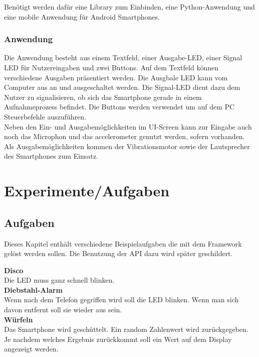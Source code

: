 \documentclass[11pt,a4paper]{report}
\begin{document}
Benötigt werden dafür eine Library zum Einbinden, eine Python-Anwendung und eine mobile Anwendung für Android Smartphones.

\subsection*{Anwendung}
Die Anwendung besteht aus einem Textfeld, einer Ausgabe-LED, einer Signal LED für Nutzereingaben und zwei Buttons.
Auf dem Textfeld können verschiedene Ausgaben präsentiert werden.
Die Ausgbale LED kann vom Computer aus an und ausgeschaltet werden.
Die Signal-LED dient dazu dem Nutzer zu signalisieren, ob sich das Smartphone gerade in einem Aufnahmeprozess befindet.
Die Buttons werden verwendet um auf dem PC Steuerbefehle auszuführen.
\\
Neben den Ein- und Ausgabemöglichkeiten im UI-Screen kann zur Eingabe auch noch das Microphon und das accelerometer genutzt werden, sofern vorhanden.
Als Ausgabemöglichkeiten kommen der Vibrationsmotor sowie der Lautsprecher des Smartphones zum Einsatz.

\chapter{Experimente/Aufgaben} \label{chap:Experimente}

\section*{Aufgaben}
Dieses Kapitel enthält verschiedene Beispielaufgaben die mit dem Framework gelöst werden sollen.
Die Benutzung der API dazu wird später geschildert.


\textbf{Disco}\\
Die LED muss ganz schnell blinken.
\\

\textbf{Diebstahl-Alarm}\\
Wenn nach dem Telefon gegriffen wird soll die LED blinken.
Wenn man sich davon entfernt soll sie wieder aus sein.
\\

\textbf{Würfeln}\\
Das Smartphone wird geschüttelt.
Ein random Zahlenwert wird zurückgegeben.
Je nachdem welches Ergebnis zurückkommt soll ein Wert auf dem Display angezeigt werden.
\\
\end{document}
